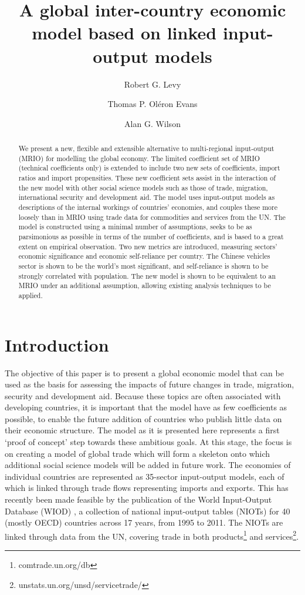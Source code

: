 \documentclass[a4paper]{article}
\title{A global inter-country economic model based on linked input-output models}
\author[*]{Robert G. Levy}
\author[**]{Thomas P. Ol\'{e}ron Evans}
\author[*]{Alan G. Wilson}
\affil[*]{Centre for Advanced Spatial Analysis, UCL Bartlett Faculty of the Built Environment,
90 Tottenham Court Road, London W1T 4TJ, UK}
\affil[**]{Department of Mathematics, University College London, Gower Street, London WC1E 6BT, UK}
\begin{document}
\maketitle

\begin{abstract}
We present a new, flexible and extensible alternative to multi-regional input-output (MRIO) for modelling the global economy.
The limited coefficient set of MRIO (technical coefficients only) is extended to include two new sets of coefficients, import ratios and import propensities.
These new coefficient sets assist in the interaction of the new model with other social science models such as those of trade, migration, international security and development aid.
The model uses input-output models as descriptions of the internal workings of countries' economies, and couples these more loosely than in MRIO using trade data for commodities and services from the UN.
The model is constructed using a minimal number of assumptions, seeks to be as parsimonious as possible in terms of the number of coefficients, and is based to a great extent on empirical observation.
Two new metrics are introduced, measuring sectors' economic significance and economic self-reliance per country.
The Chinese vehicles sector is shown to be the world's most significant, and self-reliance is shown to be strongly correlated with population.
The new model is shown to be equivalent to an MRIO under an additional assumption, allowing existing analysis techniques to be applied.
\end{abstract}

\section{Introduction}
The objective of this paper is to present a global economic model that can be used as the basis for assessing the impacts of future changes in trade, migration, security and development aid.
Because these topics are often associated with developing countries, it is important that the model have as few coefficients as possible, to enable the future addition of countries who publish little data on their economic structure.
The model as it is presented here represents a first `proof of concept' step towards these ambitious goals.
At this stage, the focus is on creating a model of global trade which will form a skeleton onto which additional social science models will be added in future work.
The economies of individual countries are represented as 35-sector input-output models, each of which is linked through trade flows representing imports and exports.
This has recently been made feasible by the publication of the World Input-Output Database (WIOD) \parencite{timmer_world_2012}, a collection of national input-output tables (NIOTs) for 40 (mostly OECD) countries across 17 years, from 1995 to 2011.
The NIOTs are linked through data from the UN, covering trade in both products\footnote{comtrade.un.org/db} and services\footnote{unstats.un.org/unsd/servicetrade/}.
\end{document}
